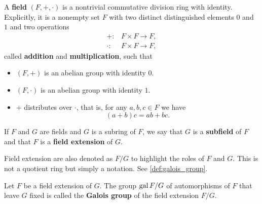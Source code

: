 \begin{definition}\label{def:field}\cite[142]{Knapp2016BAlg}
  A \textbf{field} \( (F, +, \cdot) \) is a nontrivial commutative division ring with identity. Explicitly, it is a nonempty set \( F \) with two distinct distinguished elements \( 0 \) and \( 1 \) and two operations
  \begin{align*}
    +: &F \times F \to F, \\
    \cdot: &F \times F \to F,
  \end{align*}
  called \textbf{addition} and \textbf{multiplication}, such that
  \begin{itemize}
    \item \( (F, +) \) is an abelian group with identity \( 0 \).
    \item \( (F, \cdot) \) is an abelian group with identity \( 1 \).
    \item \( + \) distributes over \( \cdot \), that is, for any \( a, b, c \in F \) we have
    \begin{equation*}
      (a + b)c = ab + bc.
    \end{equation*}
  \end{itemize}
\end{definition}

\begin{definition}\label{def:field_extension}
  If \( F \) and \( G \) are fields and \( G \) is a subring of \( F \), we say that \( G \) is a \textbf{subfield} of \( F \) and that \( F \) is a \textbf{field extension} of \( G \).

  Field extension are also denoted as \( F / G \) to highlight the roles of \( F \) and \( G \). This is not a quotient ring but simply a notation. See \cref{def:galois_group}.
\end{definition}

\begin{definition}\label{def:galois_group}\cite[124]{Knapp2016BAlg}
  Let \( F \) be a field extension of \( G \). The group \( \operatorname{gal}{F / G} \) of automorphisms of \( F \) that leave \( G \) fixed is called the \textbf{Galois group} of the field extension \( F / G \).
\end{definition}
